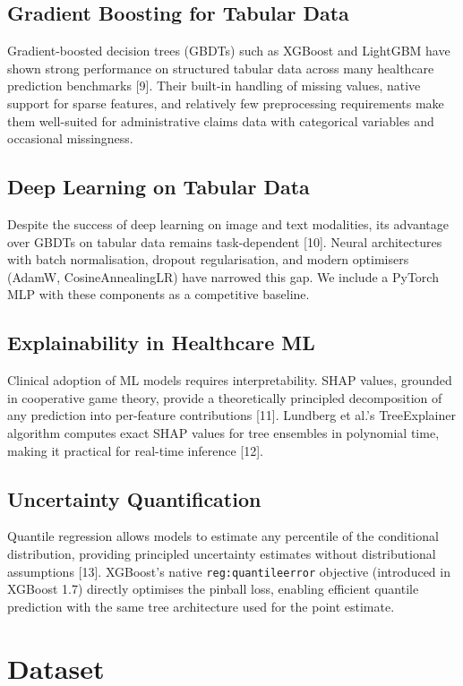 \documentclass[11pt,a4paper]{article}
\begin{document}
\subsection{Gradient Boosting for Tabular Data}
Gradient-boosted decision trees (GBDTs) such as XGBoost and LightGBM have shown strong performance on structured tabular data across many healthcare prediction benchmarks [9]. Their built-in handling of missing values, native support for sparse features, and relatively few preprocessing requirements make them well-suited for administrative claims data with categorical variables and occasional missingness.

\subsection{Deep Learning on Tabular Data}
Despite the success of deep learning on image and text modalities, its advantage over GBDTs on tabular data remains task-dependent [10]. Neural architectures with batch normalisation, dropout regularisation, and modern optimisers (AdamW, CosineAnnealingLR) have narrowed this gap. We include a PyTorch MLP with these components as a competitive baseline.

\subsection{Explainability in Healthcare ML}
Clinical adoption of ML models requires interpretability. SHAP values, grounded in cooperative game theory, provide a theoretically principled decomposition of any prediction into per-feature contributions [11]. Lundberg et al.'s TreeExplainer algorithm computes exact SHAP values for tree ensembles in polynomial time, making it practical for real-time inference [12].

\subsection{Uncertainty Quantification}
Quantile regression allows models to estimate any percentile of the conditional distribution, providing principled uncertainty estimates without distributional assumptions [13]. XGBoost's native \texttt{reg:quantileerror} objective (introduced in XGBoost 1.7) directly optimises the pinball loss, enabling efficient quantile prediction with the same tree architecture used for the point estimate.

\section{Dataset}
\end{document}
